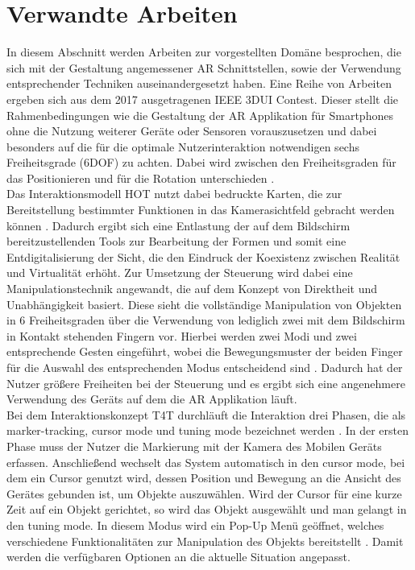 \documentclass[12pt,a4paper, oneside]{scrartcl}
\begin{document}
\section{Verwandte Arbeiten}
In diesem Abschnitt werden Arbeiten zur vorgestellten Domäne besprochen, die sich mit der Gestaltung angemessener AR Schnittstellen, sowie der Verwendung entsprechender Techniken auseinandergesetzt haben.
Eine Reihe von Arbeiten ergeben sich aus dem 2017 ausgetragenen IEEE 3DUI Contest. Dieser stellt die Rahmenbedingungen wie die Gestaltung der AR Applikation für Smartphones ohne die Nutzung weiterer Geräte oder Sensoren vorauszusetzen und dabei besonders auf die für die optimale Nutzerinteraktion notwendigen sechs Freiheitsgrade  (6DOF) zu achten. Dabei wird zwischen den Freiheitsgraden für das Positionieren und für die Rotation unterschieden \cite{guo_mcmahan_weyers_2017}. \\
Das Interaktionsmodell HOT nutzt dabei bedruckte Karten, die zur Bereitstellung bestimmter Funktionen in das Kamerasichtfeld gebracht werden können \cite{attanasio_2017}. 
Dadurch ergibt sich eine Entlastung der auf dem Bildschirm bereitzustellenden Tools zur Bearbeitung der Formen und somit eine Entdigitalisierung der Sicht, die den Eindruck der Koexistenz zwischen Realität und Virtualität erhöht. Zur Umsetzung der Steuerung wird dabei eine Manipulationstechnik angewandt, die auf dem Konzept von Direktheit und Unabhängigkeit basiert. Diese sieht die vollständige Manipulation von Objekten in 6 Freiheitsgraden über die Verwendung von lediglich zwei mit dem Bildschirm in Kontakt stehenden Fingern vor. Hierbei werden zwei Modi und zwei entsprechende Gesten eingeführt, wobei die Bewegungsmuster der beiden Finger für die Auswahl des entsprechenden Modus entscheidend sind \cite{liu_2012}. Dadurch hat der Nutzer größere Freiheiten bei der Steuerung und es ergibt sich eine angenehmere Verwendung des Geräts auf dem die AR Applikation läuft. \\
Bei dem Interaktionskonzept T4T durchläuft die Interaktion drei Phasen, die als marker-tracking, cursor mode und tuning mode bezeichnet werden \cite{cannavo_2020}.
In der ersten Phase muss der Nutzer die Markierung mit der Kamera des Mobilen Geräts erfassen. Anschließend wechselt das System automatisch in den cursor mode, bei dem ein Cursor genutzt wird, dessen Position und Bewegung an die Ansicht des Gerätes gebunden ist, um Objekte auszuwählen. Wird der Cursor für eine kurze Zeit auf ein Objekt gerichtet, so wird das Objekt ausgewählt und man gelangt in den tuning mode. In diesem Modus wird ein Pop-Up Menü geöffnet, welches verschiedene Funktionalitäten zur Manipulation des Objekts bereitstellt \cite{cannavo_2017}. Damit werden die verfügbaren Optionen an die aktuelle Situation angepasst. \\
\end{document}

